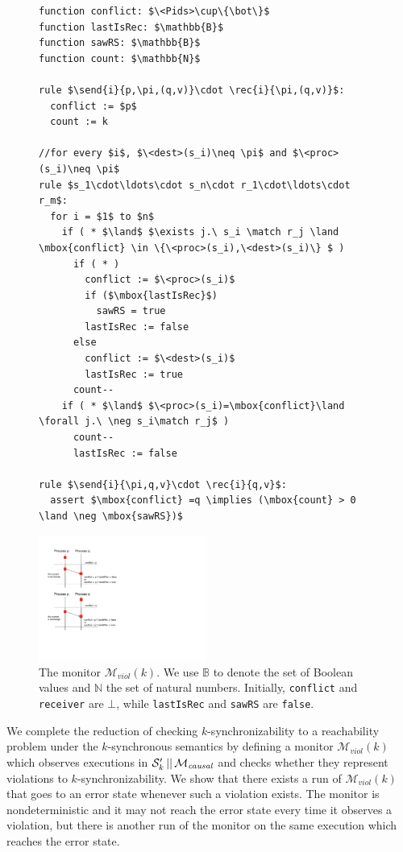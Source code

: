 \begin{figure}
\begin{minipage}{6.5cm}
\begin{lstlisting}
function conflict: $\<Pids>\cup\{\bot\}$
function lastIsRec: $\mathbb{B}$
function sawRS: $\mathbb{B}$
function count: $\mathbb{N}$

rule $\send{i}{p,\pi,(q,v)}\cdot \rec{i}{\pi,(q,v)}$:
  conflict := $p$
  count := k

//for every $i$, $\<dest>(s_i)\neq \pi$ and $\<proc>(s_i)\neq \pi$
rule $s_1\cdot\ldots\cdot s_n\cdot r_1\cdot\ldots\cdot r_m$:
  for i = $1$ to $n$
    if ( * $\land$ $\exists j.\ s_i \match r_j \land \mbox{conflict} \in \{\<proc>(s_i),\<dest>(s_i)\} $ )
      if ( * )
        conflict := $\<proc>(s_i)$
        if ($\mbox{lastIsRec}$)
          sawRS = true
        lastIsRec := false
      else 
        conflict := $\<dest>(s_i)$
        lastIsRec := true
      count--
    if ( * $\land$ $\<proc>(s_i)=\mbox{conflict}\land \forall j.\ \neg s_i\match r_j$ )
      count--
      lastIsRec := false

rule $\send{i}{\pi,q,v}\cdot \rec{i}{q,v}$:
  assert $\mbox{conflict} =q \implies (\mbox{count} > 0 \land \neg \mbox{sawRS})$
\end{lstlisting}
\end{minipage}
\hspace{5mm}
\begin{minipage}{5.5cm}
\includegraphics[width=5.5cm]{Borderline-mviol.pdf}
\end{minipage}
\caption{The monitor $\mathcal{M}_{\mathit{viol}}(k)$. We use $\mathbb{B}$ to denote the set of Boolean values and $\mathbb{N}$ the set of natural numbers. Initially, {\tt conflict} and {\tt receiver} are $\bot$, while {\tt lastIsRec} and {\tt sawRS} are {\tt false}.}
\label{fig:mon_viol}
\end{figure}

We complete the reduction of checking $k$-synchronizability to a reachability problem under the $k$-synchronous semantics by defining a monitor $\mathcal{M}_{\mathit{viol}}(k)$ which observes executions in $\mathcal{S}_k' \,||\,\mathcal{M}_{\mathit{causal}}$ and checks whether they represent violations to $k$-synchronizability. We show that there exists a run of $\mathcal{M}_{\mathit{viol}}(k)$ that goes to an error state whenever such a violation exists. The monitor is nondeterministic and it may not reach the error state every time it observes a violation, but there is another run of the monitor on the same execution which reaches the error state. 

